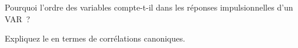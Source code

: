 \begin{interviewq}\label{iq:qm:multivariate-series-and-cointegration:5}
Pourquoi l'ordre des variables compte-t-il dans les réponses impulsionnelles d'un VAR~?
\end{interviewq}

\begin{interviewq}\label{iq:qm:multivariate-series-and-cointegration:6}
Expliquez le  en termes de corrélations canoniques.
\end{interviewq}
